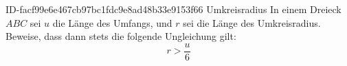 \begin{exercise}
      {ID-facf99e6e467cb97bc1fdc9e8ad48b33e9153f66}
      {Umkreisradius}
  \ifproblem\problem
    In einem Dreieck $ABC$ sei $u$ die Länge des Umfangs, und $r$ sei die Länge des Umkreisradius.
    Beweise, dass dann stets die folgende Ungleichung gilt:
    \begin{equation*}
      r>\frac{u}{6}
    \end{equation*}
  \fi
\end{exercise}
